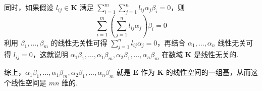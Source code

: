\begin{enumerate}
          同时，如果假设 $ l_{ij} \in \mathbf{K} $ 满足 $ \displaystyle\sum_{i = 1}^{m} \displaystyle\sum_{j = 1}^{n} l_{ij} \alpha_j \beta_i = 0 $，则
          \[ \sum_{i = 1}^{m} \left(\sum_{j = 1}^{n} l_{ij} \alpha_j\right) \beta_i = 0 \]
          利用 $ \beta_1, \ldots, \beta_m $ 的线性无关性可得 $ \displaystyle\sum_{j = 1}^{n} l_{ij} \alpha_j = 0 $，再结合 $ \alpha_1, \ldots, \alpha_n $ 线性无关可得 $ l_{ij} = 0 $，这就说明 $ \alpha_1 \beta_1, \ldots, \alpha_1 \beta_m, \alpha_2 \beta_1, \ldots, \alpha_n \beta_m $ 在数域 $ \mathbf{K} $ 是线性无关的.

          综上，$ \alpha_1 \beta_1, \ldots, \alpha_1 \beta_m, \alpha_2 \beta_1, \ldots, \alpha_n \beta_m $ 就是 $ \mathbf{E} $ 作为 $ \mathbf{K} $ 的线性空间的一组基，从而这个线性空间是 $ mn $ 维的.
\end{enumerate}

\clearpage
